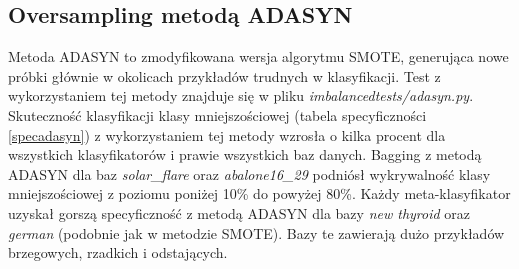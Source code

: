 \subsection{Oversampling metodą ADASYN}
Metoda ADASYN to zmodyfikowana wersja algorytmu SMOTE, generująca nowe próbki głównie w okolicach przykładów trudnych w klasyfikacji. Test z wykorzystaniem tej metody znajduje się w pliku \textit{imbalancedtests/adasyn.py}. Skuteczność klasyfikacji klasy mniejszościowej (tabela specyficzności \ref{specadasyn}) z wykorzystaniem tej metody wzrosła o kilka procent dla wszystkich klasyfikatorów i prawie wszystkich baz danych. Bagging z metodą ADASYN dla baz \textit{solar\_flare} oraz \textit{abalone16\_29} podniósł wykrywalność klasy mniejszościowej z poziomu poniżej 10\% do powyżej 80\%. Każdy meta-klasyfikator uzyskał gorszą specyficzność z metodą ADASYN dla bazy \textit{new thyroid} oraz \textit{german} (podobnie jak w metodzie SMOTE). Bazy te zawierają dużo przykładów brzegowych, rzadkich i odstających. 
